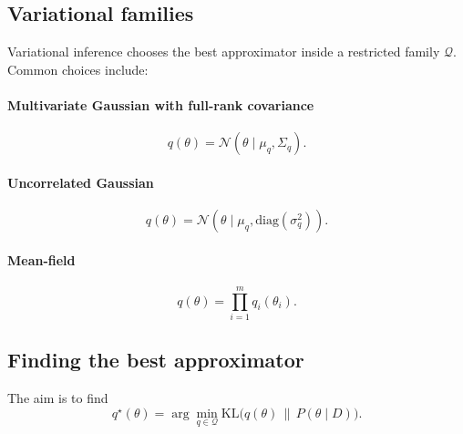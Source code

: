 \documentclass[11pt, titlepage]{article} %
\numberwithin{equation}{section}
\theoremstyle{definition}
\numberwithin{assumption}{section}
\begin{document}
\subsection{Variational families}

Variational inference chooses the best approximator inside a restricted family $\mathcal{Q}$. Common choices include:

\paragraph{Multivariate Gaussian with full-rank covariance}
\begin{equation*}
    q(\theta)=\mathcal{N}(\theta\mid \mu_q,\Sigma_q).
\end{equation*}

\paragraph{Uncorrelated Gaussian}
\begin{equation*}
    q(\theta)=\mathcal{N}(\theta\mid \mu_q,\mathrm{diag}(\sigma_q^2)).
\end{equation*}

\paragraph{Mean-field}
\begin{equation*}
    q(\theta)=\prod_{i=1}^m q_i(\theta_i).
\end{equation*}


\subsection{Finding the best approximator}

The aim is to find
\begin{equation*}
    q^\star(\theta)
    =
    \arg\min_{q\in \mathcal{Q}}
    \mathrm{KL}\!\bigl(q(\theta)\,\|\,P(\theta\mid D)\bigr).
\end{equation*}
\end{document}
